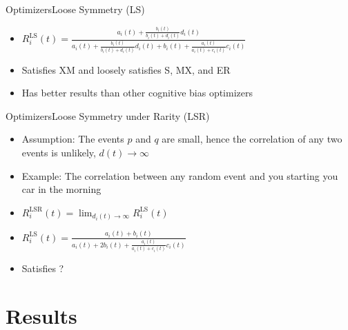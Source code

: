 \documentclass[
	aspectratio=169,	%
	onlytextwidth,		%
	t,					%
	]{beamer}
\begin{document}
	\begin{frame}[fragile]{Optimizers}{Loose Symmetry (LS)}

		\begin{itemize}
			
		\item<1-> $R^{\text{LS}}_{i}(t) = \frac{a_{i}(t) 
		+ \frac{b_{i}(t)}{b_{i}(t) + d_{i}(t)}d_{i}(t)}
		{a_{i}(t) 
		+ \frac{b_{i}(t)}{b_{i}(t) + d_{i}(t)}d_{i}(t) 
		+ b_{i}(t) 
		+ \frac{a_{i}(t)}{a_{i}(t) + c_{i}(t)}c_{i}(t)}$~\cite{3, 7} %
		\vspace{10pt}
		\item<2-> Satisfies XM and loosely satisfies S, MX, and ER~\cite{3} %
		\item <3-> Has better results than other cognitive bias optimizers~\cite{something} %
		\end{itemize}
	\end{frame}

	\begin{frame}[fragile]{Optimizers}{Loose Symmetry under Rarity (LSR)}

		\begin{itemize}

		\item<1-> Assumption: The events $p$ and $q$ are small, hence the correlation of any two events is unlikely, $d(t) \rightarrow \infty$~\cite{22} %
		\item <2-> Example: The correlation between any random event and you starting you car in the morning~\cite{22} %
		\item<3-> $R^{\text{LSR}}_{i}(t) = \lim_{d_{i}(t) \to \infty}R^{\text{LS}}_{i}(t)$
		\item<4-> $R^{\text{LS}}_{i}(t) = \frac{a_{i}(t) 
		+ b_{i}(t)}
		{a_{i}(t) 
		+ 2b_{i}(t) 
		+ \frac{a_{i}(t)}{a_{i}(t) + c_{i}(t)}c_{i}(t)}$~\cite{3} %
		\vspace{10pt}
		\item<5-> Satisfies ?~\cite{something} %
		\end{itemize}
	\end{frame}

	\section{Results}

			
\end{document}

